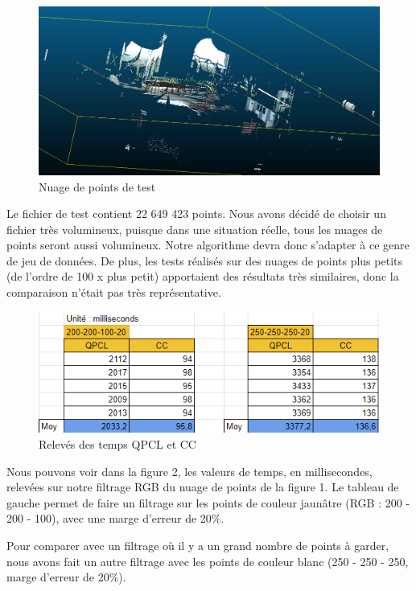 \documentclass[12pt,titlepage,french]{article}
\begin{document}
\begin{figure}[!hbtp]
  \caption{\label{} Nuage de points de test}
  \includegraphics[width=1\textwidth]{./img/scan.png}
\end{figure}

Le fichier de test contient 22 649 423 points. Nous avons décidé de choisir un fichier très volumineux, puisque dans une situation réelle, tous les nuages de points seront aussi volumineux. Notre algorithme devra donc s'adapter à ce genre de jeu de données. De plus, les tests réalisés sur des nuages de points plus petits (de l'ordre de 100 x plus petit) apportaient des résultats très similaires, donc la comparaison n'était pas très représentative. \newline

\begin{figure}[!hbtp]
  \caption{\label{} Relevés des temps QPCL et CC}
  \includegraphics[width=1\textwidth]{./img/donnees.png}
\end{figure}

Nous pouvons voir dans la figure 2, les valeurs de temps, en millisecondes, relevées sur notre filtrage RGB du nuage de points de la figure 1. Le tableau de gauche permet de faire un filtrage sur les points de couleur jaunâtre (RGB : 200 - 200 - 100), avec une marge d'erreur de 20\%.

Pour comparer avec un filtrage où il y a un grand nombre de points à garder, nous avons fait un autre filtrage avec les points de couleur blanc (250 - 250 - 250, marge d'erreur de 20\%). \newline
\end{document}
